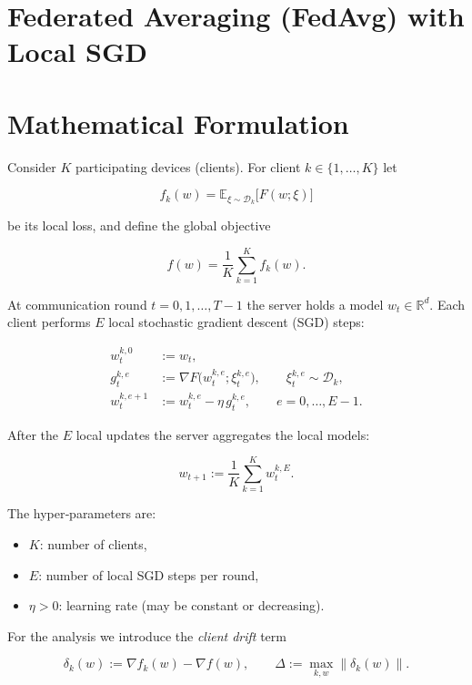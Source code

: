 \documentclass[11pt]{article}
\newcommand{\norm}[1]{\left\lVert#1\right\rVert}
\begin{document}
\section*{Federated Averaging (FedAvg) with Local SGD}

\section*{Mathematical Formulation}
Consider $K$ participating devices (clients).  
For client $k\in\{1,\dots ,K\}$ let  

\[
f_k(w)=\mathbb{E}_{\xi\sim\mathcal{D}_k}\big[F(w;\xi)\big]
\]

be its local loss, and define the global objective  

\[
f(w)=\frac1K\sum_{k=1}^{K}f_k(w).
\]

At communication round $t=0,1,\dots ,T-1$ the server holds a model $w_t\in\mathbb{R}^d$.  
Each client performs $E$ local stochastic gradient descent (SGD) steps:

\[
\begin{aligned}
w_{t}^{k,0} &:= w_t,\\
g_{t}^{k,e} &:= \nabla F\big(w_{t}^{k,e};\xi_{t}^{k,e}\big),\qquad 
\xi_{t}^{k,e}\sim\mathcal{D}_k,\\
w_{t}^{k,e+1} &:= w_{t}^{k,e}-\eta\, g_{t}^{k,e},
\qquad e=0,\dots ,E-1 .
\end{aligned}
\]

After the $E$ local updates the server aggregates the local models:

\[
w_{t+1}:=\frac1K\sum_{k=1}^{K} w_{t}^{k,E}.
\]

The hyper‑parameters are:
\begin{itemize}
\item $K$: number of clients,
\item $E$: number of local SGD steps per round,
\item $\eta>0$: learning rate (may be constant or decreasing).
\end{itemize}

For the analysis we introduce the \emph{client drift} term  

\[
\delta_k(w):=\nabla f_k(w)-\nabla f(w),\qquad 
\Delta:=\max_{k,w}\norm{\delta_k(w)} .
\]
\end{document}
